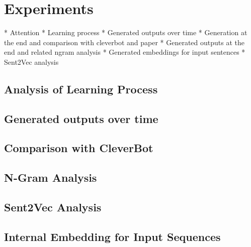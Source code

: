 \chapter{Experiments}
\blindtext

* Attention
* Learning process
* Generated outputs over time
* Generation at the end and comparison with cleverbot and paper
* Generated outputs at the end and related ngram analysis
* Generated embeddings for input sentences
* Sent2Vec analysis


\section{Analysis of Learning Process}
\blindtext

\section{Generated outputs over time}
\blindtext

\section{Comparison with CleverBot}
\blindtext

\section{N-Gram Analysis}
\blindtext

\section{Sent2Vec Analysis}
\blindtext

\section{Internal Embedding for Input Sequences}
\blindtext